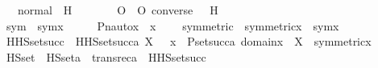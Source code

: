 \begin{isabellebody}
\ \ \ {\isasymF}{\isacharunderscore}{\kern0pt}normal\ {\isacharcolon}{\kern0pt}\ {\isachardoublequoteopen}{\isasymforall}H\ {\isasymin}\ {\isasymF}{\isachardot}{\kern0pt}\ {\isasymforall}{\isasympi}\ {\isasymin}\ {\isasymG}{\isachardot}{\kern0pt}\ {\isacharbraceleft}{\kern0pt}\ {\isasympi}\ O\ {\isasymtau}\ O\ converse{\isacharparenleft}{\kern0pt}{\isasympi}{\isacharparenright}{\kern0pt}{\isachardot}{\kern0pt}\ {\isasymtau}\ {\isasymin}\ H\ {\isacharbraceright}{\kern0pt}\ {\isasymin}\ {\isasymF}{\isachardoublequoteclose}\ \isanewline
{}\isanewline
\isanewline
{}\isamarkupfalse%
\ sym\ \ {\isachardoublequoteopen}sym{\isacharparenleft}{\kern0pt}x{\isacharparenright}{\kern0pt}\ {\isasymequiv}\ {\isacharbraceleft}{\kern0pt}\ {\isasympi}\ {\isasymin}\ {\isasymG}{\isachardot}{\kern0pt}\ Pn{\isacharunderscore}{\kern0pt}auto{\isacharparenleft}{\kern0pt}{\isasympi}{\isacharparenright}{\kern0pt}{\isacharbackquote}{\kern0pt}x\ {\isacharequal}{\kern0pt}\ x\ {\isacharbraceright}{\kern0pt}{\isachardoublequoteclose}\ \ \isanewline
\isanewline
{}\isamarkupfalse%
\ symmetric\ \ {\isachardoublequoteopen}symmetric{\isacharparenleft}{\kern0pt}x{\isacharparenright}{\kern0pt}\ {\isasymequiv}\ sym{\isacharparenleft}{\kern0pt}x{\isacharparenright}{\kern0pt}\ {\isasymin}\ {\isasymF}{\isachardoublequoteclose}\ \ \isanewline
\isanewline
{}\isamarkupfalse%
\ HHS{\isacharunderscore}{\kern0pt}set{\isacharunderscore}{\kern0pt}succ\ \ {\isachardoublequoteopen}HHS{\isacharunderscore}{\kern0pt}set{\isacharunderscore}{\kern0pt}succ{\isacharparenleft}{\kern0pt}a{\isacharcomma}{\kern0pt}\ X{\isacharparenright}{\kern0pt}\ {\isasymequiv}\ {\isacharbraceleft}{\kern0pt}\ x\ {\isasymin}\ P{\isacharunderscore}{\kern0pt}set{\isacharparenleft}{\kern0pt}succ{\isacharparenleft}{\kern0pt}a{\isacharparenright}{\kern0pt}{\isacharparenright}{\kern0pt}{\isachardot}{\kern0pt}\ domain{\isacharparenleft}{\kern0pt}x{\isacharparenright}{\kern0pt}\ {\isasymsubseteq}\ X\ {\isasymand}\ symmetric{\isacharparenleft}{\kern0pt}x{\isacharparenright}{\kern0pt}\ {\isacharbraceright}{\kern0pt}{\isachardoublequoteclose}\ \isanewline
\isanewline
{}\isamarkupfalse%
\ HS{\isacharunderscore}{\kern0pt}set\ \ {\isachardoublequoteopen}HS{\isacharunderscore}{\kern0pt}set{\isacharparenleft}{\kern0pt}a{\isacharparenright}{\kern0pt}\ {\isasymequiv}\ transrec{}{\isacharparenleft}{\kern0pt}a{\isacharcomma}{\kern0pt}\ {}{\isacharcomma}{\kern0pt}\ HHS{\isacharunderscore}{\kern0pt}set{\isacharunderscore}{\kern0pt}succ{\isacharparenright}{\kern0pt}{\isachardoublequoteclose}\ \isanewline

\end{isabellebody}
